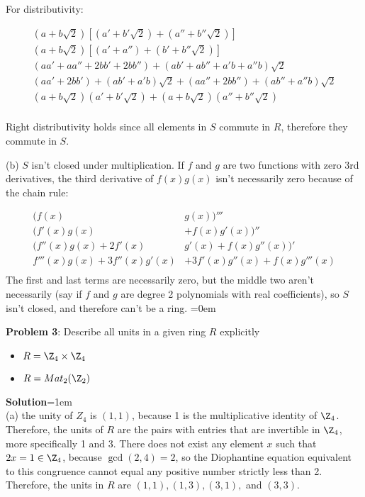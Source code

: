 \documentclass{article}
\begin{document}
For distributivity:

\begin{align*}
    (a + b\sqrt2)\left[(a' + b'\sqrt2) + (a'' + b''\sqrt2)\right]\\
    (a + b\sqrt2)\left[(a'+a'') + (b'+b''\sqrt2)\right]\\
    (aa' + aa'' + 2bb' + 2bb'') + (ab'+ab'' + a'b + a''b)\sqrt2\\
    (aa' + 2bb' ) + (ab' + a'b )\sqrt2 + (aa'' + 2bb'')+(ab''+ a''b)\sqrt2\\
    (a + b\sqrt2)(a' + b'\sqrt2) + (a + b\sqrt2)(a''+ b''\sqrt2)\\
\end{align*}

Right distributivity holds since all elements in $S$ commute in $R$, therefore they commute in $S$.

(b) $S$ isn't closed under multiplication. If $f$ and $g$ are two functions with zero 3rd derivatives, the third derivative of $f(x)g(x)$ isn't necessarily zero because of the chain rule:

\begin{align*}
    (f(x)&g(x))'''\\
    (f'(x)g(x) &+ f(x)g'(x))''\\
    (f''(x)g(x) + 2f'(x)&g'(x)+ f(x)g''(x))'\\
    f'''(x)g(x)+ 3f''(x)g'(x) &+ 3f'(x)g''(x) + f(x)g'''(x)\\
\end{align*}
The first and last terms are necessarily zero, but the middle two aren't necessarily (say if $f$ and $g$ are degree 2 polynomials with real coefficients), so $S$ isn't closed, and therefore can't be a ring.
\newpage\parskip=0em
\begin{mdframed}[backgroundcolor=blue!20]
\textbf{Problem 3}: Describe all units in a given ring $R$ explicitly
\begin{itemize}
    \item $R = \Z_4 \times \Z_4$
    \item $R = Mat_2(\Z_2)$
\end{itemize}
\end{mdframed}
\textbf{Solution}\parskip=1em\\
(a) the unity of $Z_4$ is $(1, 1)$, because 1 is the multiplicative identity of $\Z_4$. Therefore, the units of $R$ are the pairs with entries that are invertible in $\Z_4$, more specifically 1 and 3. There does not exist any element $x$ such that $2x = 1 \in \Z_4$, because $\gcd(2, 4) = 2$, so the Diophantine equation equivalent to this congruence cannot equal any positive number strictly less than 2. Therefore, the units in $R$ are $(1, 1), (1, 3), (3, 1), $ and $(3, 3)$.
\end{document}
